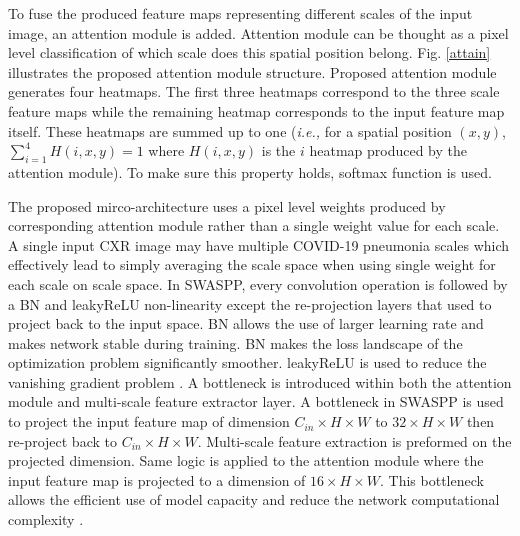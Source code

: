 To fuse the produced feature maps representing different scales of the input image, an attention module is added. Attention module can be thought as a pixel level classification of which scale does this spatial position belong. Fig. \ref{attain} illustrates the proposed attention module structure. Proposed attention module generates four heatmaps. The first three heatmaps correspond to the three scale feature maps while the remaining heatmap corresponds to the input feature map itself. These heatmaps are summed  up to one (\textit{i.e.,} for a  spatial position 
$(x, y)$, $\sum_{i =1}^{4} H(i,x,y) = 1$ where $H(i,x,y)$ is the $i$ heatmap produced by the attention module). To make sure this property holds, softmax function is used. 

The proposed mirco-architecture uses a pixel level weights produced by corresponding attention module rather than a single weight value for each scale. A single input CXR image may have multiple COVID-19 pneumonia scales which effectively lead to simply averaging the scale space when using single weight for each scale on scale space. In SWASPP, every convolution operation is followed by a BN and leakyReLU \cite{krizhevsky2012imagenet} non-linearity except the re-projection layers that used to project back to the input space. 
BN allows the use of larger learning rate\cite{ioffe2015batch} and makes network stable during training\cite{ioffe2015batch}. BN makes the loss landscape of the optimization problem significantly smoother\cite{santurkar2018does}.
leakyReLU is used to reduce the vanishing gradient problem \cite{krizhevsky2012imagenet}.
A bottleneck is introduced within both the attention module and multi-scale feature extractor layer. A bottleneck in SWASPP is used to project the input feature map of dimension $C_{in}\times H\times W$ to $32\times H\times W$ then re-project back to $C_{in}\times H\times W$. Multi-scale feature extraction is preformed on the projected dimension. Same logic is applied to the attention module where the input feature map is projected to a dimension of $16\times H\times W$.
This bottleneck allows the efficient use of model capacity and reduce the network computational complexity \cite{huang2017densely}. 

